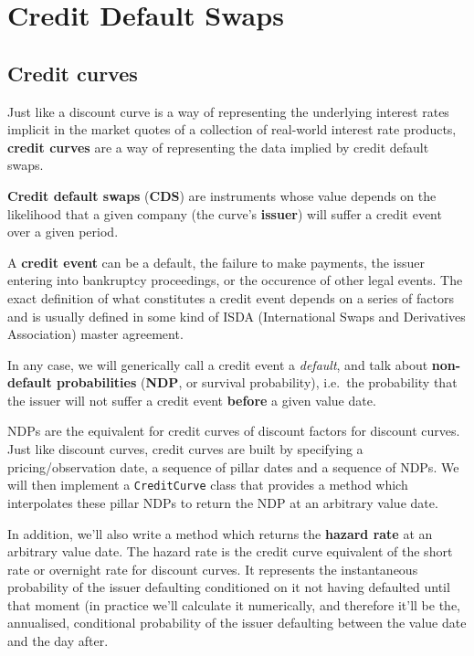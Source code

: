 \chapter{Credit Default Swaps}

\section{Credit curves}\label{credit-curves}

Just like a discount curve is a way of representing the underlying
interest rates implicit in the market quotes of a collection of
real-world interest rate products, \textbf{credit curves} are a way of
representing the data implied by credit default swaps.

\textbf{Credit default swaps} (\textbf{CDS}) are instruments whose value
depends on the likelihood that a given company (the curve's
\textbf{issuer}) will suffer a credit event over a given period.

A \textbf{credit event} can be a default, the failure to make payments,
the issuer entering into bankruptcy proceedings, or the occurence of
other legal events. The exact definition of what constitutes a credit
event depends on a series of factors and is usually defined in some kind
of ISDA (International Swaps and Derivatives Association) master
agreement.

In any case, we will generically call a credit event a \emph{default},
and talk about \textbf{non-default probabilities} (\textbf{NDP}, or
survival probability), i.e.~the probability that the issuer will
not suffer a credit event \textbf{before} a given value date.

NDPs are the equivalent for credit curves of discount factors for
discount curves. Just like discount curves, credit curves are built by
specifying a pricing/observation date, a sequence of pillar dates and a
sequence of NDPs. We will then implement a \texttt{CreditCurve} class
that provides a method which interpolates these pillar NDPs
to return the NDP at an arbitrary value date.

In addition, we'll also write a method which returns the \textbf{hazard
rate} at an arbitrary value date. The hazard rate is the credit curve
equivalent of the short rate or overnight rate for discount curves. It
represents the instantaneous probability of the issuer defaulting
conditioned on it not having defaulted until that moment (in
practice we'll calculate it numerically, and therefore it'll be the, annualised,
conditional probability of the issuer defaulting between
the value date and the day after.

